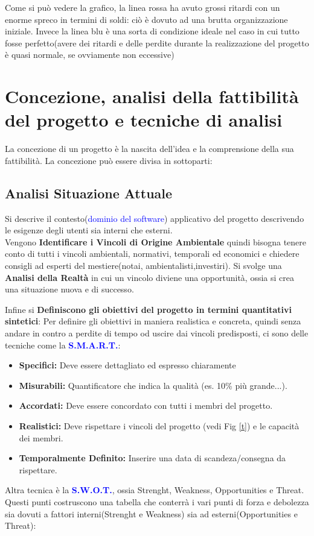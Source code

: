 \documentclass{report}
\begin{document}
Come si può vedere la grafico, la linea rossa ha avuto grossi ritardi con un enorme spreco in termini di soldi: ciò è dovuto ad una brutta organizzazione iniziale.
Invece la linea blu è una sorta di condizione ideale nel caso in cui tutto fosse perfetto(avere dei ritardi e delle perdite durante la realizzazione del progetto è quasi normale, se ovviamente non eccessive)

\section{Concezione, analisi della fattibilità del progetto e tecniche di analisi}
La concezione di un progetto è la nascita dell'idea e la comprensione della sua fattibilità.
La concezione può essere divisa in sottoparti:

\subsection{Analisi Situazione Attuale}
Si descrive il contesto(\textcolor{blue}{dominio del software}) applicativo del progetto descrivendo le esigenze degli utenti sia interni che esterni.\\
Vengono \textbf{Identificare i Vincoli di Origine Ambientale} quindi bisogna tenere conto di tutti i vincoli ambientali, normativi, temporali ed economici e chiedere consigli ad esperti del mestiere(notai, ambientalisti,investiri).
Si svolge una \textbf{Analisi della Realtà} in cui un vincolo diviene una opportunità, ossia si crea una situazione nuova e di successo.

Infine si \textbf{Definiscono gli obiettivi del progetto in termini quantitativi sintetici}:
Per definire gli obiettivi in maniera realistica e concreta, quindi senza andare in contro a perdite di tempo od uscire dai vincoli predisposti, ci sono delle tecniche come
la \textbf{\textcolor{blue}{S.M.A.R.T.}}:
\begin{itemize}
	\item \textbf{Specifici:} Deve essere dettagliato ed espresso chiaramente
	\item \textbf{Misurabili:} Quantificatore che indica la qualità (es. 10\% più grande...).
	\item \textbf{Accordati:} Deve essere concordato con tutti i membri del progetto.
	\item \textbf{Realistici:} Deve rispettare i vincoli del progetto (vedi Fig \ref{t}) e le 										capacità dei membri.
	\item \textbf{Temporalmente Definito:} Inserire una data di scandeza/consegna da rispettare.
\end{itemize}
Altra tecnica è la \textbf{\textcolor{blue}{S.W.O.T.}}, ossia Strenght, Weakness, Opportunities e Threat.
Questi punti costruscono una tabella che conterrà i vari punti di forza e debolezza sia dovuti a fattori interni(Strenght e Weakness) sia ad esterni(Opportunities e Threat):
\end{document}
